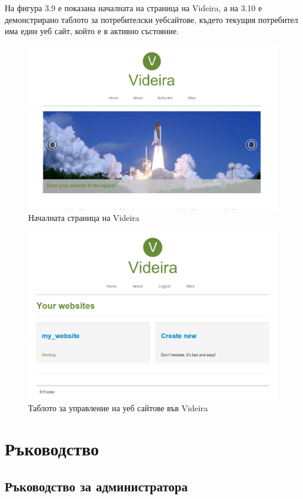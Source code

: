 \documentclass[pdftex,14pt,a4paper]{extreport}
\begin{document}
На фигура 3.9 е показана началната на страница на Videira, а на 3.10 е демонстрирано таблото за потребителски уебсайтове, където текущия потребител има един уеб сайт, който е в активно състояние.
\begin{figure}[H]
  \centering
  \includegraphics [scale=0.42]{./videira_index}
  \caption {Началната страница на Videira}
\end{figure}
\begin{figure}[H]
  \centering
  \includegraphics [scale=0.4]{./videira_tenants}
  \caption {Таблото за управление на уеб сайтове във Videira}
\end{figure}
\chapter {Ръководство}
\section {Ръководство за администратора}
\end{document}

